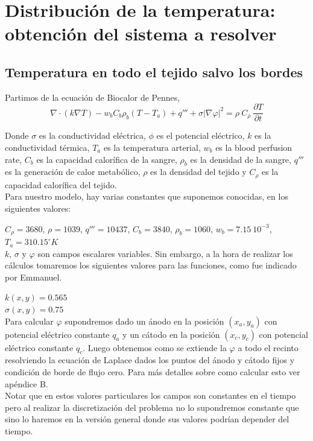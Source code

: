 \documentclass[a4paper]{article}
\begin{document}
\section{Distribuci\'on de la temperatura: obtención del sistema a resolver}

\subsection{Temperatura en todo el tejido salvo los bordes}
Partimos de la ecuación de Biocalor de Pennes, 
$$\nabla \cdot (k \nabla T) - w_b C_b \rho_b (T-T_a) + q''' + \sigma |\nabla \varphi|^2 = \rho \ C_\rho \ \frac{\partial T}{\partial t}$$

Donde $\sigma$ es la conductividad eléctrica, $\phi$ es el potencial eléctrico, $k$ es la conductividad térmica, $T_a$ es la temperatura arterial, $w_b$ es la blood perfusion rate, $C_b$ es la capacidad calorífica de la sangre, $\rho_b$ es la densidad de la sangre, $q'''$ es la generación de calor metabólico, $\rho$ es la densidad del tejido y $C_\rho$ es la capacidad calorífica del tejido.\\

Para nuestro modelo, hay varias constantes que suponemos conocidas, en los siguientes valores:

$C_\rho= 3680$, $\rho= 1039$, $q'''= 10437$, $C_b= 3840$, $\rho_b= 1060$, $w_b=7.15 \ 10^{-3}$, $T_a = 310.15^\circ K$ \\

$k$, $\sigma$ y $\varphi$ son campos escalares variables. Sin embargo, a la hora de realizar los cálculos tomaremos los siguientes valores para las funciones,
como fue indicado por Emmanuel. 

$k(x,y)=0.565$ \\
$\sigma(x,y)=0.75$ \\

Para calcular $\varphi$ supondremos dado un ánodo en la posición $(x_a, y_a)$ con potencial eléctrico constante $q_a$ y un cátodo en la posición $(x_c, y_c)$ con potencial eléctrico constante $q_c$. Luego obtenemos como se extiende la $\varphi$ a todo el recinto resolviendo la ecuación de Laplace dados los puntos del ánodo y cátodo fijos y condición de borde de flujo cero. Para más detalles sobre como calcular esto ver apéndice B.\\

Notar que en estos valores particulares los campos son constantes en el tiempo pero al realizar la discretización del problema no lo supondremos constante que sino lo haremos en la versión general donde sus valores podrían depender del tiempo.
\end{document}
